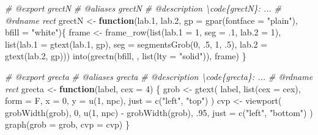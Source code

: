 \documentclass[
]{article}
\newenvironment{Shaded}{\begin{snugshade}}{\end{snugshade}}
\newcommand{\AttributeTok}[1]{\textcolor[rgb]{0.77,0.63,0.00}{#1}}
\newcommand{\CommentTok}[1]{\textcolor[rgb]{0.56,0.35,0.01}{\textit{#1}}}
\newcommand{\ControlFlowTok}[1]{\textcolor[rgb]{0.13,0.29,0.53}{\textbf{#1}}}
\newcommand{\DecValTok}[1]{\textcolor[rgb]{0.00,0.00,0.81}{#1}}
\newcommand{\FloatTok}[1]{\textcolor[rgb]{0.00,0.00,0.81}{#1}}
\newcommand{\FunctionTok}[1]{\textcolor[rgb]{0.00,0.00,0.00}{#1}}
\newcommand{\NormalTok}[1]{#1}
\newcommand{\OtherTok}[1]{\textcolor[rgb]{0.56,0.35,0.01}{#1}}
\newcommand{\SpecialCharTok}[1]{\textcolor[rgb]{0.00,0.00,0.00}{#1}}
\newcommand{\StringTok}[1]{\textcolor[rgb]{0.31,0.60,0.02}{#1}}
\begin{document}
\begin{Shaded}
\begin{Highlighting}[]
\CommentTok{\#\textquotesingle{} @export grectN}
\CommentTok{\#\textquotesingle{} @aliases grectN}
\CommentTok{\#\textquotesingle{} @description \textbackslash{}code\{grectN\}: ...}
\CommentTok{\#\textquotesingle{} @rdname rect}
\NormalTok{grectN }\OtherTok{\textless{}{-}} \ControlFlowTok{function}\NormalTok{(lab}\FloatTok{.1}\NormalTok{, lab}\FloatTok{.2}\NormalTok{, }\AttributeTok{gp =} \FunctionTok{gpar}\NormalTok{(}\AttributeTok{fontface =} \StringTok{"plain"}\NormalTok{),}
  \AttributeTok{bfill =} \StringTok{"white"}\NormalTok{)\{}
\NormalTok{  frame }\OtherTok{\textless{}{-}} \FunctionTok{frame\_row}\NormalTok{(}\FunctionTok{list}\NormalTok{(}\AttributeTok{lab.1 =} \DecValTok{1}\NormalTok{, }\AttributeTok{seg =}\NormalTok{ .}\DecValTok{1}\NormalTok{, }\AttributeTok{lab.2 =} \DecValTok{1}\NormalTok{),}
    \FunctionTok{list}\NormalTok{(}\AttributeTok{lab.1 =} \FunctionTok{gtext}\NormalTok{(lab}\FloatTok{.1}\NormalTok{, gp),}
      \AttributeTok{seg =} \FunctionTok{segmentsGrob}\NormalTok{(}\DecValTok{0}\NormalTok{, .}\DecValTok{5}\NormalTok{, }\DecValTok{1}\NormalTok{, .}\DecValTok{5}\NormalTok{),}
      \AttributeTok{lab.2 =} \FunctionTok{gtext}\NormalTok{(lab}\FloatTok{.2}\NormalTok{, gp)))}
  \FunctionTok{into}\NormalTok{(}\FunctionTok{grectn}\NormalTok{(bfill, , }\FunctionTok{list}\NormalTok{(}\AttributeTok{lty =} \StringTok{"solid"}\NormalTok{)), frame)}
\NormalTok{\}}

\CommentTok{\#\textquotesingle{} @export grecta}
\CommentTok{\#\textquotesingle{} @aliases grecta}
\CommentTok{\#\textquotesingle{} @description \textbackslash{}code\{grecta\}: ...}
\CommentTok{\#\textquotesingle{} @rdname rect}
\NormalTok{grecta }\OtherTok{\textless{}{-}} \ControlFlowTok{function}\NormalTok{(label, }\AttributeTok{cex =} \DecValTok{4}\NormalTok{) \{}
\NormalTok{  grob }\OtherTok{\textless{}{-}} \FunctionTok{gtext}\NormalTok{(}
\NormalTok{    label, }\FunctionTok{list}\NormalTok{(}\AttributeTok{cex =}\NormalTok{ cex), }\AttributeTok{form =}\NormalTok{ F,}
    \AttributeTok{x =} \DecValTok{0}\NormalTok{, }\AttributeTok{y =} \FunctionTok{u}\NormalTok{(}\DecValTok{1}\NormalTok{, npc),}
    \AttributeTok{just =} \FunctionTok{c}\NormalTok{(}\StringTok{"left"}\NormalTok{, }\StringTok{"top"}\NormalTok{)}
\NormalTok{  )}
\NormalTok{  cvp }\OtherTok{\textless{}{-}} \FunctionTok{viewport}\NormalTok{(}
    \FunctionTok{grobWidth}\NormalTok{(grob), }\DecValTok{0}\NormalTok{, }\FunctionTok{u}\NormalTok{(}\DecValTok{1}\NormalTok{, npc) }\SpecialCharTok{{-}} \FunctionTok{grobWidth}\NormalTok{(grob), .}\DecValTok{95}\NormalTok{,}
    \AttributeTok{just =} \FunctionTok{c}\NormalTok{(}\StringTok{"left"}\NormalTok{, }\StringTok{"bottom"}\NormalTok{)}
\NormalTok{  )}
  \FunctionTok{graph}\NormalTok{(}\AttributeTok{grob =}\NormalTok{ grob, }\AttributeTok{cvp =}\NormalTok{ cvp)}
\NormalTok{\}}


\end{Highlighting}
\end{Shaded}
\end{document}
